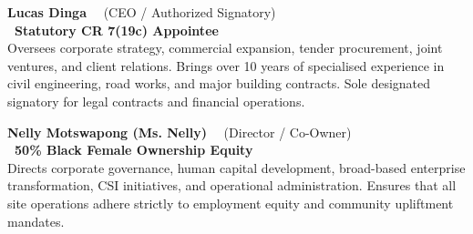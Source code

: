 \hypertarget{sec:leadership}{}
\enlargethispage{2.5cm}

\noindent
\begin{minipage}[t]{0.485\textwidth}
    \begin{tcolorbox}[
        enhanced, colback=white, colframe=mhlightgray, boxrule=0.8pt, arc=4pt,
        left=8pt, right=8pt, top=7pt, bottom=7pt,
        borderline west={3.5pt}{0pt}{mhnavy}, drop shadow=black!4
    ]
        {\fontsize{10.0pt}{12pt}\selectfont\bfseries\color{mhnavy}Lucas Dinga} \ \ {\fontsize{7.8pt}{9.5pt}\selectfont\color{mhtextmuted}(CEO / Authorized Signatory)}\\[2pt]
        {\fontsize{7.6pt}{9.5pt}\selectfont\bfseries\color{mhblue}\faUserTie\ Statutory CR 7(19c) Appointee}\\[2.5pt]
        {\fontsize{8.2pt}{11.0pt}\selectfont\color{mhtext}
        Oversees corporate strategy, commercial expansion, tender procurement, joint ventures, and client relations. Brings over 10 years of specialised experience in civil engineering, road works, and major building contracts. Sole designated signatory for legal contracts and financial operations.
        }
    \end{tcolorbox}
\end{minipage}
\hfill
\begin{minipage}[t]{0.485\textwidth}
    \begin{tcolorbox}[
        enhanced, colback=white, colframe=mhlightgray, boxrule=0.8pt, arc=4pt,
        left=8pt, right=8pt, top=7pt, bottom=7pt,
        borderline west={3.5pt}{0pt}{mhblue}, drop shadow=black!4
    ]
        {\fontsize{10.0pt}{12pt}\selectfont\bfseries\color{mhnavy}Nelly Motswapong (Ms. Nelly)} \ \ {\fontsize{7.8pt}{9.5pt}\selectfont\color{mhtextmuted}(Director / Co-Owner)}\\[2pt]
        {\fontsize{7.6pt}{9.5pt}\selectfont\bfseries\color{mhblue}\faUserShield\ 50\% Black Female Ownership Equity}\\[2.5pt]
        {\fontsize{8.2pt}{11.0pt}\selectfont\color{mhtext}
        Directs corporate governance, human capital development, broad-based enterprise transformation, CSI initiatives, and operational administration. Ensures that all site operations adhere strictly to employment equity and community upliftment mandates.
        }
    \end{tcolorbox}
\end{minipage}

